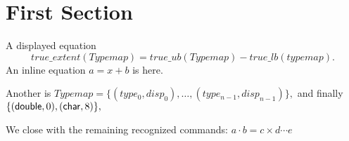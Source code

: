 \documentclass{article}
\begin{document}
\section{First Section}

A displayed equation
\[
true\_extent (Typemap) = true\_ub(Typemap) - true\_lb(typemap).
\]
An inline equation \( a = x + b \) is here.

Another is
\(
Typemap = \{ (type_0,disp_0), \ldots, (type_{n-1}, disp_{n-1}) \} ,
\)
and finally
\(
\{ ({\sf double}, 0), ({\sf char}, 8) \} ,
\)

We close with the remaining recognized commands:
\(
a \cdot b = c \times d \cdots e
\)
\end{document}
